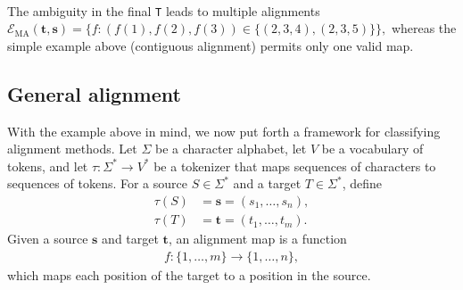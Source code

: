 \\
The ambiguity in the final \texttt{T} leads to multiple alignments $\mathcal{E}_{\mathrm{MA}}(\mathbf{t},\mathbf{s}) = \big\{ f : (f(1),f(2),f(3)) \in \{(2,3,4),(2,3,5)\} \big\},$ whereas the simple example above (contiguous alignment) permits only one valid map.

\subsection{General alignment}
With the example above in mind, we now put forth a framework for classifying alignment methods. Let $\Sigma$ be a character alphabet, let $V$ be a vocabulary of tokens, and let
$\tau : \Sigma^* \to V^*$ be a tokenizer that maps sequences of characters to sequences of tokens.
For a source $S \in \Sigma^*$ and a target $T \in \Sigma^*$, define
\begin{align}
\tau(S) &= \mathbf{s} = (s_1,\dots,s_n), \\
\tau(T) &= \mathbf{t} = (t_1,\dots,t_m).
\end{align}
Given a source $\mathbf{s}$ and target $\mathbf{t}$, an alignment map is a function
\begin{align}
f : \{1,\dots,m\} \to \{1,\dots,n\},
\end{align}
which maps each position of the target to a position in the source.

